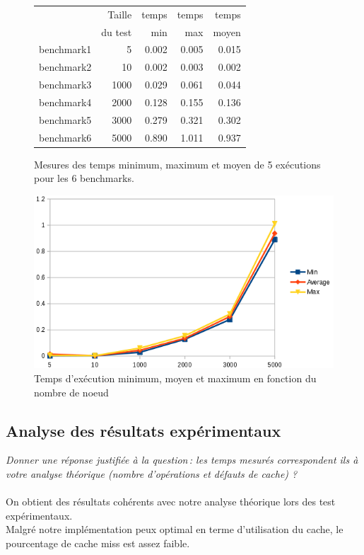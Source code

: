 \documentclass[a4paper, 10pt, french]{article}
\begin{document}
	\begin{figure}[!h]
		\begin{center}
			\begin{tabular}{|l||r||r|r|r||}
				\hline
				\hline
				& Taille         & temps     & temps   & temps \\
				& du test     & min       & max     & moyen \\
				\hline
				\hline
				benchmark1 & 5   & 0.002     & 0.005   & 0.015 \\
				\hline
				benchmark2 & 10  & 0.002     & 0.003   & 0.002 \\
				\hline
				benchmark3 & 1000  & 0.029     & 0.061   & 0.044 \\
				\hline
				benchmark4 & 2000  & 0.128    & 0.155    & 0.136 \\
				\hline
				benchmark5 & 3000  & 0.279    & 0.321    & 0.302 \\
				\hline
				benchmark6 & 5000  & 0.890    & 1.011    & 0.937 \\
				\hline
				\hline
			\end{tabular}
			\caption{Mesures des temps minimum, maximum et moyen de 5 exécutions pour les 6 benchmarks.}
			\label{table-temps}

			\vspace{2cm}
			\includegraphics[scale=0.6]{avg_comp_iter_graph.png}
			\caption{Temps d'exécution minimum, moyen et maximum en fonction du nombre de noeud}
		\end{center}
	\end{figure}

\subsection{Analyse des résultats expérimentaux}
{\em Donner  une réponse justifiée  à la question\,: 
			  les  temps mesurés correspondent ils  à votre analyse théorique (nombre d’opérations et défauts de cache) ?
}\\\\
{ On obtient des résultats cohérents avec notre analyse théorique lors des test expérimentaux.\\
  Malgré notre implémentation peux optimal en terme d'utilisation du cache, le pourcentage de cache miss est assez faible.
}
\end{document}
